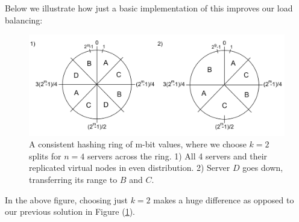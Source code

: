 \newpage 

\noindent
Below we illustrate how just a basic implementation of this improves our load balancing:
\begin{figure}[h]
        
            \centering
            \includegraphics[width=\textwidth]{Sections/shard/ring_2.png}
            \caption{A consistent hashing ring of m-bit values, where we choose $k=2$ splits for $n=4$ servers across the ring.
            1) All 4 servers and their replicated virtual nodes in even distribution. 2) Server $D$ goes down, transferring its range to $B$ and $C$.}
            \label{fig:ring_2}
\end{figure}

\noindent
In the above figure, choosing just $k=2$ makes a huge difference as opposed to our previous solution in Figure (\ref{fig:ring_2}).